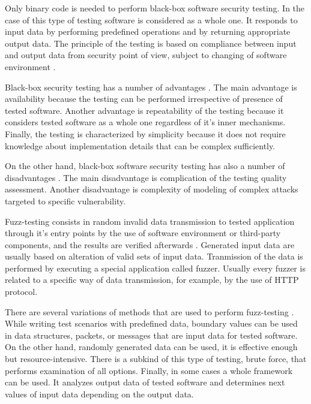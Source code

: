 %
Only binary code is needed to perform black-box software security testing. 
%
In the case of this type of testing software is considered as a whole one. 
%
It responds to input data by performing predefined operations and by returning appropriate output data. 
%
The principle of the testing is based on compliance between input and output data from \The security point of view, subject to changing of software environment . 

%
Black-box security testing has a number of advantages . 
%
The main advantage is availability because the testing can be performed irrespective of presence of tested software. 
%
Another advantage is repeatability of the testing because it considers tested software as a whole one regardless of it's inner mechanisms. 
%
Finally, the testing is characterized by simplicity because it does not require knowledge about implementation details that can be complex sufficiently. 

%
On the other hand, black-box software security testing has also a number of disadvantages . 
%
The main disadvantage is complication of the testing quality assessment. 
%
Another disadvantage is complexity of modeling of complex attacks targeted to \A specific vulnerability. 



%
Fuzz-testing consists in random invalid data transmission to \A tested application through it's entry points by the use of software environment or third-party components, and the results are verified afterwards . 
%
Generated input data are usually based on alteration of valid sets of input data. 
%
Tranmission of the data is performed by executing a special application called fuzzer. 
%
Usually every fuzzer is related to a specific way of data transmission, for example, by the use of HTTP protocol. 

%
There are several variations of methods that are used to perform fuzz-testing . 
%
While writing test scenarios with predefined data, boundary values can be used in data structures, packets, or messages that are input data for tested software. 
%
On the other hand, randomly generated data can be used, it is effective enough but resource-intensive. 
%
There is a subkind of this type of testing, brute force, that performs examination of all options. 
%
Finally, in some cases a whole framework can be used. 
%
It analyzes output data of tested software and determines next values of input data depending on the output data. 

